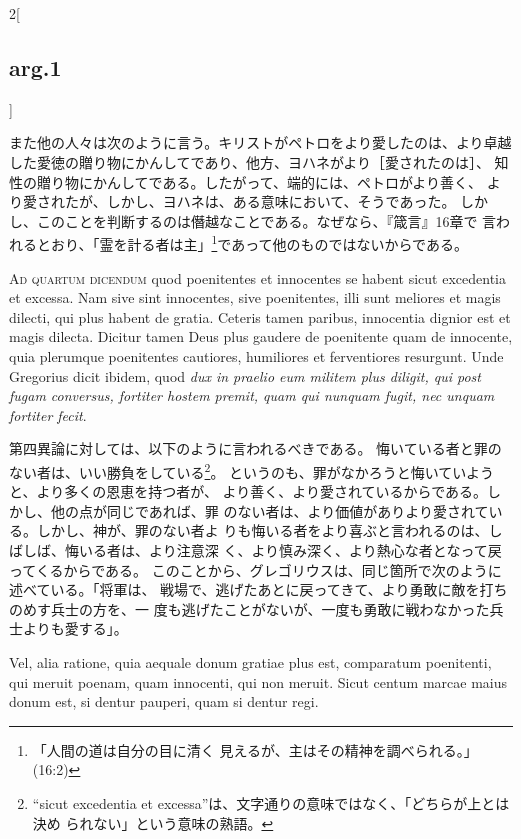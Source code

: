 \documentclass[paper=a4paper,fontsize=10pt,jafontsize=9pt,titlepage]{jlreq}
\begin{document}
\begin{paracol}{2}[\subsection{arg.1}]
\switchcolumn

また他の人々は次のように言う。キリストがペトロをより愛したのは、より卓越
 した愛徳の贈り物にかんしてであり、他方、ヨハネがより［愛されたのは］、
 知性の贈り物にかんしてである。したがって、端的には、ペトロがより善く、
 より愛されたが、しかし、ヨハネは、ある意味において、そうであった。
しかし、このことを判断するのは僭越なことである。なぜなら、『箴言』16章で
 言われるとおり、「霊を計る者は主」\footnote{「人間の道は自分の目に清く
 見えるが、主はその精神を調べられる。」(16:2)}であって他のものではないからである。

\switchcolumn*[\subsection{ad.4}]


{\scshape Ad quartum dicendum} quod poenitentes et innocentes se habent
 sicut excedentia et excessa. Nam sive sint innocentes, sive
 poenitentes, illi sunt meliores et magis dilecti, qui plus habent de
 gratia. Ceteris tamen paribus, innocentia dignior est et magis
 dilecta. Dicitur tamen Deus plus gaudere de poenitente quam de
 innocente, quia plerumque poenitentes cautiores, humiliores et
 ferventiores resurgunt. Unde Gregorius dicit ibidem, quod {\itshape dux in
 praelio eum militem plus diligit, qui post fugam conversus, fortiter
 hostem premit, quam qui nunquam fugit, nec unquam fortiter fecit}.

\switchcolumn

第四異論に対しては、以下のように言われるべきである。
 悔いている者と罪のない者は、いい勝負をしている\footnote{ ``sicut
 excedentia et excessa''は、文字通りの意味ではなく、「どちらが上とは決め
 られない」という意味の熟語。}。
 というのも、罪がなかろうと悔いていようと、より多くの恩恵を持つ者が、
 より善く、より愛されているからである。しかし、他の点が同じであれば、罪
 のない者は、より価値がありより愛されている。しかし、神が、罪のない者よ
 りも悔いる者をより喜ぶと言われるのは、しばしば、悔いる者は、より注意深
 く、より慎み深く、より熱心な者となって戻ってくるからである。
このことから、グレゴリウスは、同じ箇所で次のように述べている。「将軍は、
 戦場で、逃げたあとに戻ってきて、より勇敢に敵を打ちのめす兵士の方を、一
 度も逃げたことがないが、一度も勇敢に戦わなかった兵士よりも愛する」。

\switchcolumn*


Vel,
 alia ratione, quia aequale donum gratiae plus est, comparatum
 poenitenti, qui meruit poenam, quam innocenti, qui non meruit. Sicut
 centum marcae maius donum est, si dentur pauperi, quam si dentur regi.


\end{paracol}
\end{document}
